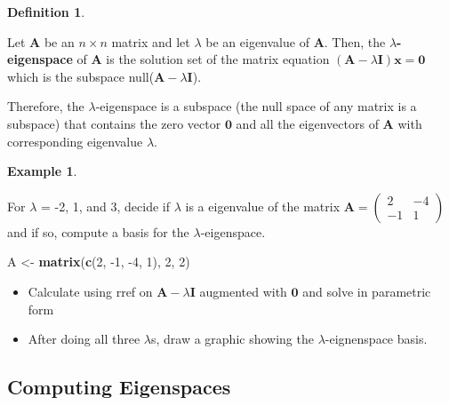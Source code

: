\documentclass[
]{book}
\newenvironment{Shaded}{\begin{snugshade}}{\end{snugshade}}
\newcommand{\DecValTok}[1]{\textcolor[rgb]{0.00,0.00,0.81}{#1}}
\newcommand{\KeywordTok}[1]{\textcolor[rgb]{0.13,0.29,0.53}{\textbf{#1}}}
\newcommand{\NormalTok}[1]{#1}
\newcommand{\StringTok}[1]{\textcolor[rgb]{0.31,0.60,0.02}{#1}}
\theoremstyle{definition}
\newtheorem{definition}{Definition}[chapter]
\theoremstyle{definition}
\newtheorem{example}{Example}[chapter]
\theoremstyle{definition}
\theoremstyle{remark}
\begin{document}
\begin{definition}
\protect\hypertarget{def:unlabeled-div-163}{}\label{def:unlabeled-div-163}

Let \(\mathbf{A}\) be an \(n \times n\) matrix and let \(\lambda\) be an eigenvalue of \(\mathbf{A}\). Then, the \textbf{\(\lambda\)-eigenspace} of \(\mathbf{A}\) is the solution set of the matrix equation \(\left( \mathbf{A} - \lambda \mathbf{I} \right) \mathbf{x} = \mathbf{0}\) which is the subspace null(\(\mathbf{A} - \lambda \mathbf{I}\)).

\end{definition}

Therefore, the \(\lambda\)-eigenspace is a subspace (the null space of any matrix is a subspace) that contains the zero vector \(\mathbf{0}\) and all the eigenvectors of \(\mathbf{A}\) with corresponding eigenvalue \(\lambda\).

\begin{example}
\protect\hypertarget{exm:unlabeled-div-164}{}\label{exm:unlabeled-div-164}

For \(\lambda\) = -2, 1, and 3, decide if \(\lambda\) is a eigenvalue of the matrix \(\mathbf{A} = \begin{pmatrix} 2 & -4 \\ -1 & 1 \end{pmatrix}\) and if so, compute a basis for the \(\lambda\)-eigenspace.

\begin{Shaded}
\begin{Highlighting}[]
\NormalTok{A <-}\StringTok{ }\KeywordTok{matrix}\NormalTok{(}\KeywordTok{c}\NormalTok{(}\DecValTok{2}\NormalTok{, }\DecValTok{-1}\NormalTok{, }\DecValTok{-4}\NormalTok{, }\DecValTok{1}\NormalTok{), }\DecValTok{2}\NormalTok{, }\DecValTok{2}\NormalTok{)}
\end{Highlighting}
\end{Shaded}

\begin{itemize}
\item
  Calculate using rref on \(\mathbf{A} - \lambda \mathbf{I}\) augmented with \(\mathbf{0}\) and solve in parametric form
\item
  After doing all three \(\lambda\)s, draw a graphic showing the \(\lambda\)-eignenspace basis.
\end{itemize}

\end{example}

\hypertarget{computing-eigenspaces}{%
\subsection{Computing Eigenspaces}\label{computing-eigenspaces}}
\end{document}

